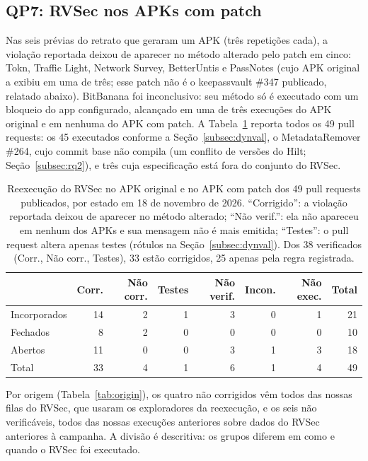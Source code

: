 \documentclass[conference]{IEEEtran}
\newcommand{\researchq}[1]{\textbf{QP#1}}
\begin{document}
\subsection{\researchq{7}: RVSec nos APKs com patch}
\label{subsec:rq7}

Nas seis prévias do retrato que geraram um APK (três repetições cada), a violação
reportada deixou de aparecer no método alterado pelo patch em cinco: Tokn, Traffic Light,
Network Survey, BetterUntis e PassNotes (cujo APK original a exibiu em uma de
três; esse patch não é o keepassvault \#347 publicado, relatado abaixo). BitBanana
foi inconclusivo: seu método só é executado com um bloqueio do app configurado,
alcançado em uma de três execuções do APK original e em nenhuma do APK com patch.
A Tabela~\ref{tab:dynval} reporta todos os 49 pull requests: os 45 executados conforme a
Seção~\ref{subsec:dynval}, o MetadataRemover \#264, cujo commit base não compila
(um conflito de versões do Hilt; Seção~\ref{subsec:rq2}), e três cuja especificação
está fora do conjunto do RVSec.

\begin{table}[H]
\centering
\caption{Reexecução do RVSec no APK original e no APK com patch dos 49 pull requests
publicados, por estado em 18 de novembro de 2026. ``Corrigido'': a violação reportada
deixou de aparecer no método alterado; ``Não verif.'': ela não apareceu em nenhum
dos APKs e sua mensagem não é mais emitida; ``Testes'': o pull request altera
apenas testes (rótulos na Seção~\ref{subsec:dynval}). Dos 38 verificados (Corr.,
Não corr., Testes), 33 estão corrigidos, 25 apenas pela regra registrada.}
\label{tab:dynval}
\footnotesize
\setlength{\tabcolsep}{2pt}
\begin{tabular}{lrrrrrrr}
\toprule
 & Corr. & Não corr. & Testes & Não verif. & Incon. & Não exec. & Total \\
\midrule
Incorporados & 14 & 2 & 1 & 3 & 0 & 1 & 21 \\
Fechados     & 8 & 2 & 0 & 0 & 0 & 0 & 10 \\
Abertos      & 11 & 0 & 0 & 3 & 1 & 3 & 18 \\
\midrule
Total        & 33 & 4 & 1 & 6 & 1 & 4 & 49 \\
\bottomrule
\end{tabular}
\end{table}

Por origem (Tabela~\ref{tab:origin}), os quatro não corrigidos vêm todos das
nossas filas do RVSec, que usaram os exploradores da reexecução, e os seis não
verificáveis, todos das nossas execuções anteriores sobre dados do RVSec
anteriores à campanha. A divisão é descritiva: os grupos diferem em como e
quando o RVSec foi executado.
\end{document}
